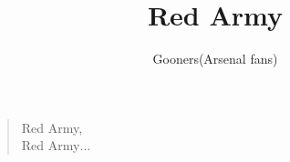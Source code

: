 \documentclass[a4paper,12pt]{article}
\title{Red Army}
\author{Gooners(Arsenal fans)}
\date{}
\begin{document}
	
	\maketitle
	
	\begin{verse}
		
		Red Army, \\
		Red Army$\ldots$
		
	\end{verse}
	
\end{document}
